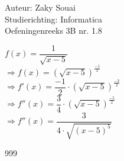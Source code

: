 \documentclass[a4paper]{article}
\begin{document}
  
\noindent \large Auteur: Zaky Souai \\
\noindent \large Studierichting:  Informatica\\
\noindent \large Oefeningenreeks 3B nr. 1.8\\

\bigskip

\normalsize

$f(x) = \dfrac{1}{\sqrt{x-5}}$ \\

$\Rightarrow f(x) = (\sqrt{x-5})^{\tfrac{-1}{2}} $ \\

$\Rightarrow f'(x) = \dfrac{-1}{2} \cdot (\sqrt{x-5})^{\tfrac{-3}{2}}$ \\

$\Rightarrow f''(x) = \dfrac{3}{4} \cdot (\sqrt{x-5})^{\tfrac{-5}{2}}$ \\

$\Rightarrow f''(x) = \dfrac{3}{4 \cdot \sqrt{(x-5)^5}}$ \\



\begin{thebibliography}{999}
\end{thebibliography}
\end{document}
